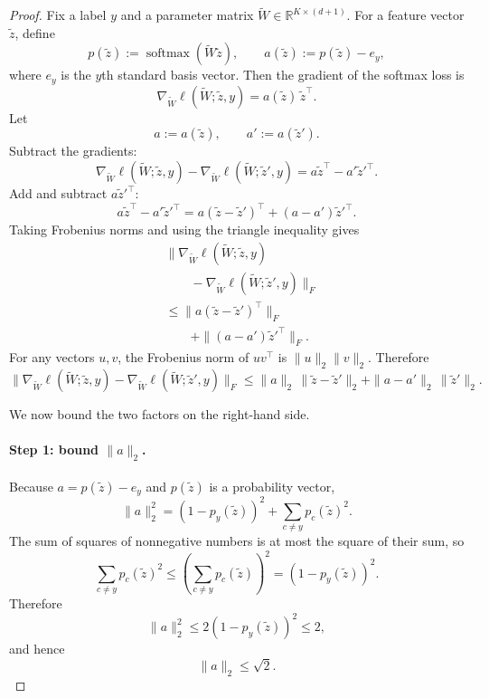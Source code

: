 \documentclass[11pt,a4paper]{report}
\theoremstyle{plain}
\theoremstyle{definition}
\theoremstyle{remark}
\DeclareMathOperator{\softmax}{softmax}
\begin{document}
\begin{proof}
Fix a label $y$ and a parameter matrix $\widetilde W\in\mathbb{R}^{K\times(d+1)}$. For a feature vector $\widetilde z$, define
\[
p(\widetilde z):=\softmax(\widetilde W\widetilde z),
\qquad
a(\widetilde z):=p(\widetilde z)-e_y,
\]
where $e_y$ is the $y$th standard basis vector. Then the gradient of the softmax loss is
\[
\nabla_{\widetilde W}\ell(\widetilde W;\widetilde z,y)
=
a(\widetilde z)\,\widetilde z^\top.
\]
Let
\[
a:=a(\widetilde z),
\qquad
a':=a(\widetilde z').
\]
Subtract the gradients:
\[
\nabla_{\widetilde W}\ell(\widetilde W;\widetilde z,y)
-
\nabla_{\widetilde W}\ell(\widetilde W;\widetilde z',y)
=
a\widetilde z^\top-a'\widetilde z'^\top.
\]
Add and subtract $a\widetilde z'^\top$:
\[
a\widetilde z^\top-a'\widetilde z'^\top
=
a(\widetilde z-\widetilde z')^\top+(a-a')\widetilde z'^\top.
\]
Taking Frobenius norms and using the triangle inequality gives
\[
\begin{aligned}
&\bigl\|
\nabla_{\widetilde W}\ell(\widetilde W;\widetilde z,y) \\
&\qquad -
\nabla_{\widetilde W}\ell(\widetilde W;\widetilde z',y)
\bigr\|_F \\
&\le
\|a(\widetilde z-\widetilde z')^\top\|_F \\
&\qquad +
\|(a-a')\widetilde z'^\top\|_F.
\end{aligned}
\]
For any vectors $u,v$, the Frobenius norm of $uv^\top$ is $\|u\|_2\|v\|_2$. Therefore
\begin{equation}
\label{eq:softmax-split}
\bigl\|
\nabla_{\widetilde W}\ell(\widetilde W;\widetilde z,y)
-
\nabla_{\widetilde W}\ell(\widetilde W;\widetilde z',y)
\bigr\|_F
\le
\|a\|_2\,\|\widetilde z-\widetilde z'\|_2
+
\|a-a'\|_2\,\|\widetilde z'\|_2.
\end{equation}

We now bound the two factors on the right-hand side.

\paragraph{Step 1: bound $\|a\|_2$.}
Because $a=p(\widetilde z)-e_y$ and $p(\widetilde z)$ is a probability vector,
\[
\|a\|_2^2
=
(1-p_y(\widetilde z))^2+\sum_{c\neq y}p_c(\widetilde z)^2.
\]
The sum of squares of nonnegative numbers is at most the square of their sum, so
\[
\sum_{c\neq y}p_c(\widetilde z)^2
\le
\left(\sum_{c\neq y}p_c(\widetilde z)\right)^2
=
(1-p_y(\widetilde z))^2.
\]
Therefore
\[
\|a\|_2^2
\le
2(1-p_y(\widetilde z))^2
\le
2,
\]
and hence
\begin{equation}
\label{eq:a-bound}
\|a\|_2\le \sqrt{2}.
\end{equation}


\end{proof}
\end{document}
